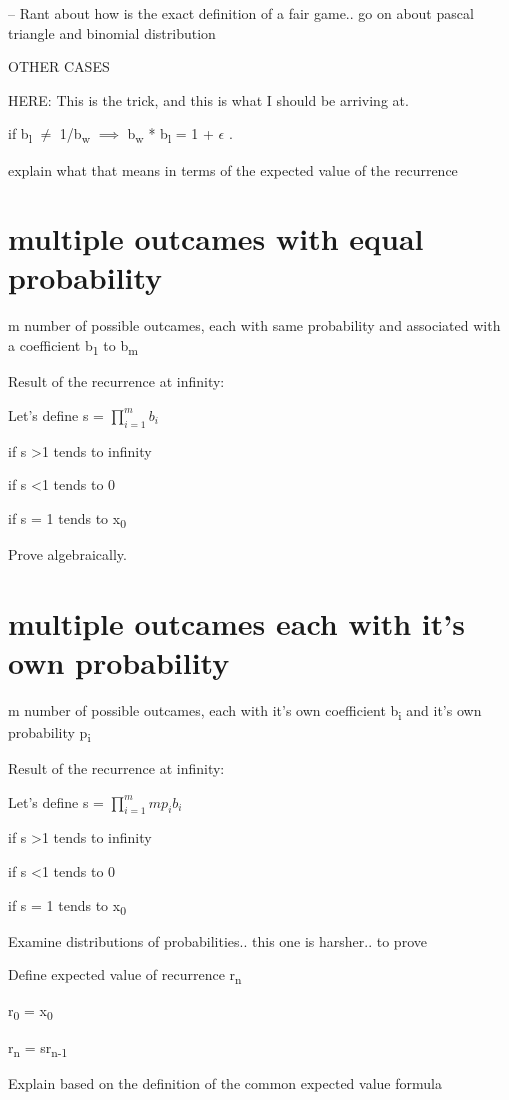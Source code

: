 \documentclass[12pt,reqno]{amsart}
\begin{document}
-- Rant about how is the exact definition of a fair game.. go on about pascal triangle and binomial distribution


OTHER CASES

HERE: This is the trick, and this is what I should be arriving at.

if b\textsubscript{l} $\neq$ 1/b\textsubscript{w}  $\implies$  b\textsubscript{w} * b\textsubscript{l} = 1 + $\epsilon$ .

explain what that means in terms of the expected value of the recurrence


\section{multiple outcames with equal probability}

m number of possible outcames, each with same probability and associated with a coefficient b\textsubscript{1} to b\textsubscript{m}



Result of the recurrence at infinity:



Let's define s = $\prod_{i=1}^{m} b_{i}$

if s \textgreater 1 tends to infinity

if s \textless 1 tends to 0

if s = 1 tends to x\textsubscript{0}


Prove algebraically.

\section{multiple outcames each with it's own probability}

m number of possible outcames, each with it's own coefficient b\textsubscript{i} and it's own probability p\textsubscript{i}

Result of the recurrence at infinity:

Let's define s = $\prod_{i=1}^{m} mp_{i}b_{i}$



if s \textgreater 1 tends to infinity

if s \textless 1 tends to 0

if s = 1 tends to x\textsubscript{0}



Examine distributions of probabilities.. this one is harsher.. to prove



Define expected value of recurrence r\textsubscript{n}

r\textsubscript{0} = x\textsubscript{0}

r\textsubscript{n} = sr\textsubscript{n-1}

Explain based on the definition of the common expected value formula
\end{document}
